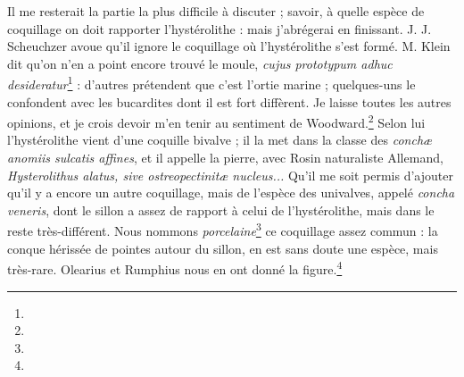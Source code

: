 \documentclass[a4paper, 11pt, oneside, polutonikogreek, french]{article}
\begin{document}
Il me resterait la partie la plus difficile à discuter ; savoir, à quelle espèce de coquillage on doit rapporter l'hystérolithe : mais j'abrégerai en finissant. J. J. Scheuchzer avoue qu'il ignore le coquillage où l'hystérolithe s'est formé. M. Klein dit qu'on n'en a point encore trouvé le moule, \emph{cujus prototypum adhuc desideratur}\footnote{} : d'autres prétendent que c'est l'ortie marine ; quelques-uns le confondent avec les bucardites dont il est fort diffèrent. Je laisse toutes les autres opinions, et je crois devoir m'en tenir au sentiment de Woodward.\footnote{} Selon lui l'hystérolithe vient d'une coquille bivalve ; il la met dans la classe des \emph{conchæ anomiis sulcatis affines}, et il appelle la pierre, avec Rosin naturaliste Allemand, \emph{Hysterolithus alatus, sive ostreopectinitæ nucleus...} Qu'il me soit permis d'ajouter qu'il y a encore un autre coquillage, mais de l'espèce des univalves, appelé \emph{concha veneris}, dont le sillon a assez de rapport à celui de l'hystérolithe, mais dans le reste très-différent. Nous nommons \emph{porcelaine}\footnote{} ce coquillage assez commun : la conque hérissée de pointes autour du sillon, en est sans doute une espèce, mais très-rare. Olearius et Rumphius nous en ont donné la figure.\footnote{}
\clearpage
\end{document}
